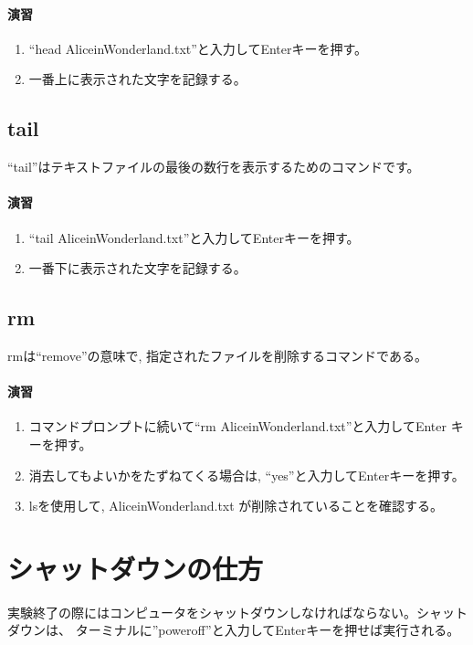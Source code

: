 \paragraph{演習}
\begin{enumerate}
\item ``head AliceinWonderland.txt''と入力してEnterキーを押す。
\item 一番上に表示された文字を記録する。
\end{enumerate}

\subsection{tail}
``tail''はテキストファイルの最後の数行を表示するためのコマンドです。

\paragraph{演習}
\begin{enumerate}
\item ``tail AliceinWonderland.txt''と入力してEnterキーを押す。
\item 一番下に表示された文字を記録する。
\end{enumerate}

\subsection{rm}
 rmは``remove''の意味で, 指定されたファイルを削除するコマンドである。

\paragraph{演習}
\begin{enumerate}
\item コマンドプロンプトに続いて``rm  AliceinWonderland.txt''と入力してEnter
      キーを押す。

\item 消去してもよいかをたずねてくる場合は, ``yes''と入力してEnterキーを押す。

\item lsを使用して, AliceinWonderland.txt が削除されていることを確認する。

\end{enumerate}


\section{シャットダウンの仕方}
実験終了の際にはコンピュータをシャットダウンしなければならない。シャットダウンは、
ターミナルに''poweroff''と入力してEnterキーを押せば実行される。

